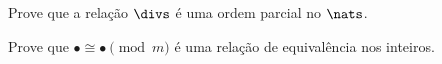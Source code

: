 \begin{exercise}
	Prove que a relação $\divs$ é uma ordem parcial no $\nats$.
\end{exercise}

\begin{exercise}
	Prove que $\bullet \cong \bullet \pmod m$ é uma relação de equivalência nos inteiros.
\end{exercise}

